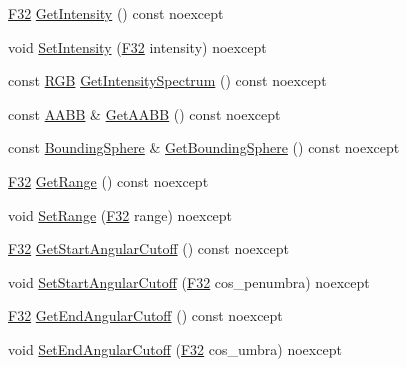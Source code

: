 \begin{DoxyCompactItemize}
\item 
\hyperlink{namespacemage_aa97e833b45f06d60a0a9c4fc22ae02c0}{F32} \hyperlink{classmage_1_1rendering_1_1_spot_light_ac3fe64c6d599149cf569693f74ac41e8}{Get\+Intensity} () const noexcept
\item 
void \hyperlink{classmage_1_1rendering_1_1_spot_light_aa59f043d14fb1e66377c9462c350717f}{Set\+Intensity} (\hyperlink{namespacemage_aa97e833b45f06d60a0a9c4fc22ae02c0}{F32} intensity) noexcept
\item 
const \hyperlink{structmage_1_1_r_g_b}{R\+GB} \hyperlink{classmage_1_1rendering_1_1_spot_light_a049401f9c26b106acddfcb7ec09b0418}{Get\+Intensity\+Spectrum} () const noexcept
\item 
const \hyperlink{classmage_1_1_a_a_b_b}{A\+A\+BB} \& \hyperlink{classmage_1_1rendering_1_1_spot_light_a09e58c11a2f81de811c4d8e51c5d13c3}{Get\+A\+A\+BB} () const noexcept
\item 
const \hyperlink{classmage_1_1_bounding_sphere}{Bounding\+Sphere} \& \hyperlink{classmage_1_1rendering_1_1_spot_light_a003e42ab1d3059ae5750893bcaa8e0b3}{Get\+Bounding\+Sphere} () const noexcept
\item 
\hyperlink{namespacemage_aa97e833b45f06d60a0a9c4fc22ae02c0}{F32} \hyperlink{classmage_1_1rendering_1_1_spot_light_a14383d05dafe535cf0cc162e3015181e}{Get\+Range} () const noexcept
\item 
void \hyperlink{classmage_1_1rendering_1_1_spot_light_a87711b67a7a16809711f9841e4708720}{Set\+Range} (\hyperlink{namespacemage_aa97e833b45f06d60a0a9c4fc22ae02c0}{F32} range) noexcept
\item 
\hyperlink{namespacemage_aa97e833b45f06d60a0a9c4fc22ae02c0}{F32} \hyperlink{classmage_1_1rendering_1_1_spot_light_ab865663954e848ad42c84e759c7ceea7}{Get\+Start\+Angular\+Cutoff} () const noexcept
\item 
void \hyperlink{classmage_1_1rendering_1_1_spot_light_a01db83a4c9e64ff48dc4152359abec84}{Set\+Start\+Angular\+Cutoff} (\hyperlink{namespacemage_aa97e833b45f06d60a0a9c4fc22ae02c0}{F32} cos\+\_\+penumbra) noexcept
\item 
\hyperlink{namespacemage_aa97e833b45f06d60a0a9c4fc22ae02c0}{F32} \hyperlink{classmage_1_1rendering_1_1_spot_light_aab94a7a9d5434d8e7913d7b52379841b}{Get\+End\+Angular\+Cutoff} () const noexcept
\item 
void \hyperlink{classmage_1_1rendering_1_1_spot_light_a39c94841a3f839dd05f387fc87722f00}{Set\+End\+Angular\+Cutoff} (\hyperlink{namespacemage_aa97e833b45f06d60a0a9c4fc22ae02c0}{F32} cos\+\_\+umbra) noexcept

\end{DoxyCompactItemize}
